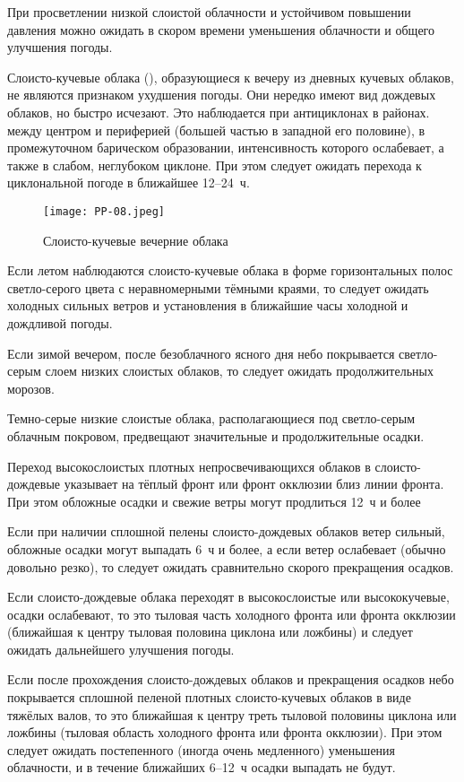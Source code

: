  При просветлении низкой слоистой облачности и устойчивом
повышении давления можно ожидать в скором времени уменьшения
облачности и общего улучшения погоды.

 Слоисто-кучевые облака (), образующиеся к вечеру из
дневных кучевых облаков, не являются признаком ухудшения погоды. Они
нередко имеют вид дождевых облаков, но быстро исчезают. Это
наблюдается при антициклонах в районах. между центром и периферией
(большей частью в западной его половине), в промежуточном барическом
образовании,
интенсивность которого ослабевает, а также в слабом,
неглубоком циклоне. При этом следует ожидать перехода к циклональной
погоде в ближайшее 12--24~ч.

\begin{figure}[htb]
  \centering{}
  \texttt{[image: PP-08.jpeg]}
  \caption{Слоисто-кучевые вечерние облака}
  \label{fig:pp08}
  \small
  \centering{}
\end{figure}

 Если летом наблюдаются слоисто-кучевые облака в форме
горизонтальных полос светло-серого цвета с неравномерными тёмными
краями, то следует ожидать холодных сильных ветров и установления в
ближайшие часы холодной и дождливой погоды.

 Если зимой вечером, после безоблачного ясного дня небо
покрывается светло-серым слоем низких слоистых облаков, то следует
ожидать продолжительных морозов.

 Темно-серые низкие слоистые облака, располагающиеся под
светло-серым облачным покровом, предвещают значительные и
продолжительные осадки.

 Переход высокослоистых плотных непросвечивающихся облаков в
слоисто-дождевые указывает на тёплый фронт или фронт окклюзии близ
линии фронта. При этом обложные осадки и свежие ветры могут продлиться
12~ч и более

 Если при наличии сплошной пелены слоисто-дождевых облаков ветер
сильный, обложные осадки могут выпадать 6~ч и более, а если ветер
ослабевает (обычно довольно резко), то следует ожидать сравнительно
скорого прекращения осадков.

 Если слоисто-дождевые облака переходят в высокослоистые или
высококучевые, осадки ослабевают, то это тыловая часть холодного
фронта или фронта окклюзии (ближайшая к центру тыловая половина
циклона или ложбины) и следует ожидать дальнейшего улучшения погоды.

 Если после прохождения слоисто-дождевых облаков и прекращения
осадков небо покрывается сплошной пеленой плотных слоисто-кучевых
облаков в виде тяжёлых валов, то это ближайшая к центру треть тыловой
половины циклона или ложбины (тыловая область холодного фронта или
фронта окклюзии). При этом следует ожидать постепенного (иногда очень
медленного) уменьшения облачности, и в течение ближайших 6--12~ч
осадки выпадать не будут.

